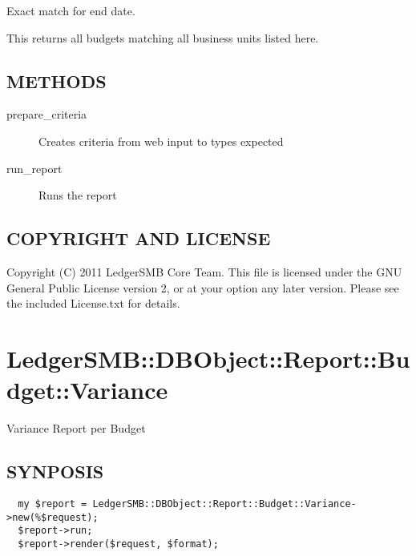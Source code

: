 \begin{description}
\begin{description}
\begin{description}
\begin{description}
\begin{description}
\begin{description}
\begin{description}
\begin{description}
\begin{description}
\begin{description}
\begin{description}
Exact match for end date.


\item[{buisness\_units}] \mbox{}

This returns all budgets matching all business units listed here.

\end{description}
\subsection*{METHODS\label{LedgerSMB::DBObject::Reports::Budget::Search_METHODS}}
\begin{description}

\item[{prepare\_criteria}] \mbox{}

Creates criteria from web input to types expected


\item[{run\_report}] \mbox{}

Runs the report

\end{description}
\subsection*{COPYRIGHT AND LICENSE\label{LedgerSMB::DBObject::Reports::Budget::Search_COPYRIGHT_AND_LICENSE}}


Copyright (C) 2011 LedgerSMB Core Team.  This file is licensed under the GNU 
General Public License version 2, or at your option any later version.  Please
see the included License.txt for details.

\section{LedgerSMB::DBObject::Report::Budget::Variance\label{LedgerSMB::DBObject::Report::Budget::Variance}}


Variance Report per Budget

\subsection*{SYNPOSIS\label{LedgerSMB::DBObject::Report::Budget::Variance_SYNPOSIS}}
\begin{verbatim}
  my $report = LedgerSMB::DBObject::Report::Budget::Variance->new(%$request);
  $report->run;
  $report->render($request, $format);
\end{verbatim}

\end{description}
\end{description}
\end{description}
\end{description}
\end{description}
\end{description}
\end{description}
\end{description}
\end{description}
\end{description}
